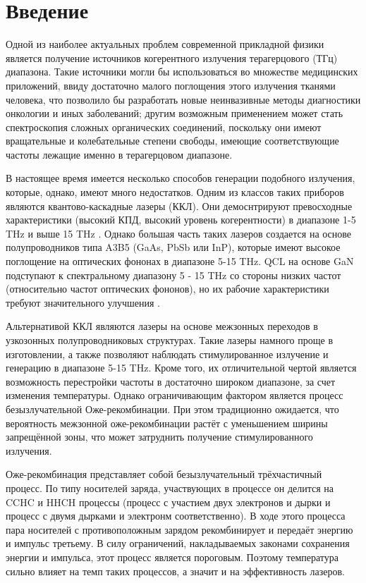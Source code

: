 \documentclass[../main.tex]{subfiles}
\begin{document}
    \chapter{Введение}

Одной из наиболее актуальных проблем современной прикладной физики является
получение источников когерентного излучения терагерцового (ТГц) диапазона. Такие
источники могли бы использоваться во множестве медицинских приложений, ввиду достаточно 
малого поглощения этого излучения тканями человека, что позволило бы разработать 
новые неинвазивные методы диагностики онкологии и иных заболеваний; другим возможным 
применением может стать спектроскопия сложных органических соединений, поскольку 
они имеют вращательные и колебательные степени свободы, имеющие соответствующие частоты 
лежащие именно в терагерцовом диапазоне.

В настоящее время имеется несколько способов генерации подобного излучения, которые, однако, 
имеют много недостатков. Одним из классов таких приборов являются квантово-каскадные лазеры (ККЛ).
Они демоснтрируют превосходные характеристики (высокий КПД, высокий уровень когерентности)
в диапазоне 1-5 THz и выше 15 THz \cite{Intro1}. Однако большая часть таких лазеров создается на основе 
полупроводников типа A3B5 (GaAs, PbSb или InP), которые имеют высокое поглощение на оптических 
фононах в диапазоне 5-15 THz. QCL на основе GaN подступают к спектральному диапазону 5 - 15 THz со
стороны низких частот (относительно частот оптических фононов), но их рабочие характеристики 
требуют значительного улучшения \cite{Intro7}.

Альтернативой ККЛ являются лазеры на основе межзонных переходов в узкозонных полупроводниковых структурах.
Такие лазеры намного проще в изготовлении, а также позволяют наблюдать стимулированное излучение и генерацию
в диапазоне 5-15 THz. Кроме того, их 
отличительной чертой является возможность перестройки частоты в достаточно широком диапазоне, за счет 
изменения температуры. Однако ограничивающим
фактором является процесс безызлучательной Оже-рекомбинации. При этом традиционно ожидается, что вероятность 
межзонной оже-рекомбинации растёт с уменьшением ширины запрещённой зоны, что может затруднить получение 
стимулированного излучения.

Оже-рекомбинация представляет собой безызлучательный трёхчастичный процесс. По типу носителей заряда, участвующих
в процессе он делится на CCHC и HHCH процессы (процесс с участием двух электронов и дырки и процесс с двумя дырками
и электронм соответственно). В ходе этого процесса пара носителей с противоположным зарядом рекомбинирует и
передаёт энергию и импульс третьему. В силу ограничений, накладываемых законами сохранения энергии и импульса,
 этот процесс является пороговым.
Поэтому температура сильно влияет на темп таких процессов, а значит и на эффективность лазеров.
\end{document}
